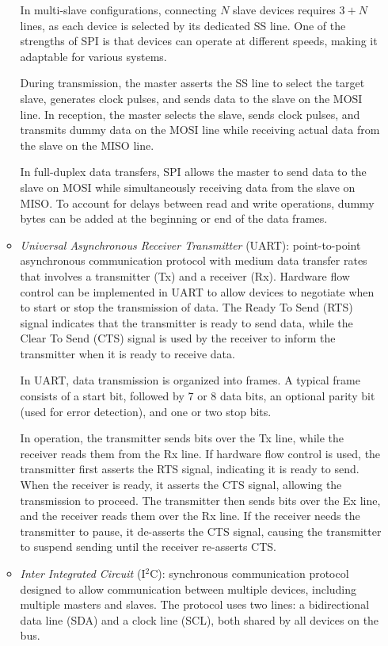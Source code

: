 \begin{itemize}
\begin{itemize}
                In multi-slave configurations, connecting $N$ slave devices requires $3 + N$ lines, as each device is selected by its dedicated SS line. 
                One of the strengths of SPI is that devices can operate at different speeds, making it adaptable for various systems.

                During transmission, the master asserts the SS line to select the target slave, generates clock pulses, and sends data to the slave on the MOSI line. 
                In reception, the master selects the slave, sends clock pulses, and transmits dummy data on the MOSI line while receiving actual data from the slave on the MISO line.

                In full-duplex data transfers, SPI allows the master to send data to the slave on MOSI while simultaneously receiving data from the slave on MISO. 
                To account for delays between read and write operations, dummy bytes can be added at the beginning or end of the data frames.
            \item \textit{Universal Asynchronous Receiver Transmitter} (UART): point-to-point asynchronous communication protocol with medium data transfer rates that involves a transmitter (Tx) and a receiver (Rx).
                Hardware flow control can be implemented in UART to allow devices to negotiate when to start or stop the transmission of data.
                The Ready To Send (RTS) signal indicates that the transmitter is ready to send data, while the Clear To Send (CTS) signal is used by the receiver to inform the transmitter when it is ready to receive data.

                In UART, data transmission is organized into frames. 
                A typical frame consists of a start bit, followed by 7 or 8 data bits, an optional parity bit (used for error detection), and one or two stop bits.

                In operation, the transmitter sends bits over the Tx line, while the receiver reads them from the Rx line. 
                If hardware flow control is used, the transmitter first asserts the RTS signal, indicating it is ready to send.
                When the receiver is ready, it asserts the CTS signal, allowing the transmission to proceed. 
                The transmitter then sends bits over the Ex line, and the receiver reads them over the Rx line. 
                If the receiver needs the transmitter to pause, it de-asserts the CTS signal, causing the transmitter to suspend sending until the receiver re-asserts CTS.
            \item \textit{Inter Integrated Circuit} (I$^2$C): synchronous communication protocol designed to allow communication between multiple devices, including multiple masters and slaves.
                The protocol uses two lines: a bidirectional data line (SDA) and a clock line (SCL), both shared by all devices on the bus.


\end{itemize}
\end{itemize}
